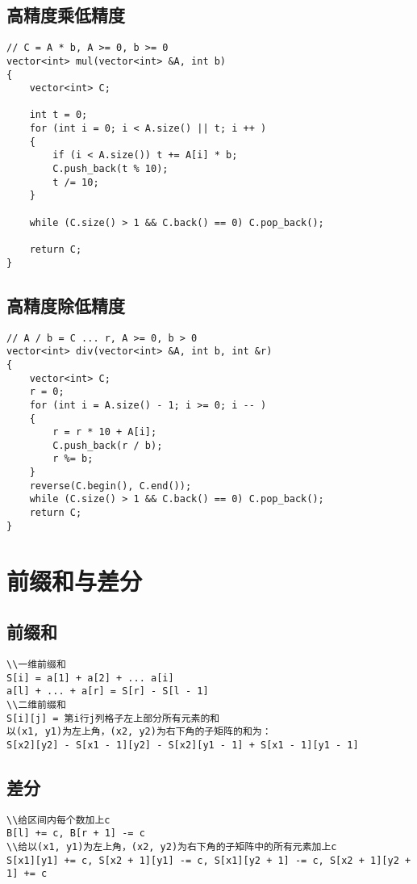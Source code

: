 \documentclass[12pt,a4paper,UTF16]{ctexbook}
\theoremstyle{plain}
\begin{document}
\subsection{高精度乘低精度}
\begin{lstlisting}
// C = A * b, A >= 0, b >= 0
vector<int> mul(vector<int> &A, int b)
{
    vector<int> C;

    int t = 0;
    for (int i = 0; i < A.size() || t; i ++ )
    {
        if (i < A.size()) t += A[i] * b;
        C.push_back(t % 10);
        t /= 10;
    }

    while (C.size() > 1 && C.back() == 0) C.pop_back();

    return C;
}
\end{lstlisting}
\subsection{高精度除低精度}
\begin{lstlisting}
// A / b = C ... r, A >= 0, b > 0
vector<int> div(vector<int> &A, int b, int &r)
{
    vector<int> C;
    r = 0;
    for (int i = A.size() - 1; i >= 0; i -- )
    {
        r = r * 10 + A[i];
        C.push_back(r / b);
        r %= b;
    }
    reverse(C.begin(), C.end());
    while (C.size() > 1 && C.back() == 0) C.pop_back();
    return C;
}
\end{lstlisting}
\newpage
\section{前缀和与差分}
\subsection{前缀和}
\begin{lstlisting}
\\一维前缀和
S[i] = a[1] + a[2] + ... a[i]
a[l] + ... + a[r] = S[r] - S[l - 1]
\\二维前缀和
S[i][j] = 第i行j列格子左上部分所有元素的和
以(x1, y1)为左上角，(x2, y2)为右下角的子矩阵的和为：
S[x2][y2] - S[x1 - 1][y2] - S[x2][y1 - 1] + S[x1 - 1][y1 - 1]
\end{lstlisting}
\subsection{差分}
\begin{lstlisting}
\\给区间内每个数加上c
B[l] += c, B[r + 1] -= c
\\给以(x1, y1)为左上角，(x2, y2)为右下角的子矩阵中的所有元素加上c
S[x1][y1] += c, S[x2 + 1][y1] -= c, S[x1][y2 + 1] -= c, S[x2 + 1][y2 + 1] += c
\end{lstlisting}
\end{document}
